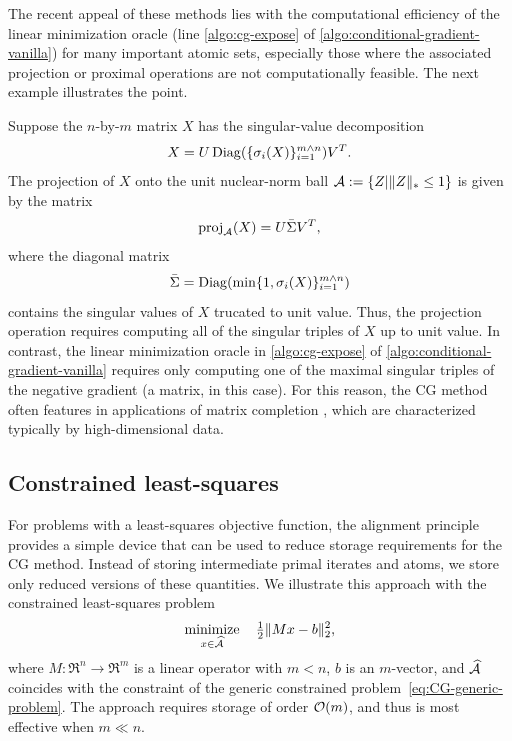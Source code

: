 The recent appeal of these methods lies with the computational efficiency of the
linear minimization oracle (line \ref{algo:cg-expose} of
\autoref{algo:conditional-gradient-vanilla}) for many important atomic sets,
especially those where the associated projection or proximal operations are not
computationally feasible. The next example illustrates the point.

\begin{example}
  Suppose the $n$-by-$m$ matrix $X$ has the singular-value decomposition
  \[
     X=U\operatorname{Diag}(\{\sigma_i(X)\}_{i=1}^{m\wedge n})V^T.
  \]
  The  projection of $X$ onto the unit nuclear-norm ball
  $\mathcal{A}:=\{Z|\|Z\|_*\le1\}$ is given by the matrix
\begin{equation*}
  \operatorname{proj}_{\mathcal{A}}(X) = U\bar\Sigma V^T,
\end{equation*}
where the diagonal matrix 
\begin{equation*}
  \bar\Sigma = \operatorname{Diag}(\min\{1,\sigma_i(X)\}^{m\wedge n}_{i=1})
\end{equation*}
contains the singular values of $X$ trucated to unit value. Thus, the projection
operation requires computing all of the singular triples of $X$ up to unit
value. In contrast, the linear minimization oracle in \autoref{algo:cg-expose} of
\autoref{algo:conditional-gradient-vanilla} requires only computing one of the
maximal singular triples of the negative gradient (a matrix, in this case). For
this reason, the CG method often features in applications of matrix completion
\cite{jaggi2010simple,shalev2011large,lee2009efficient}, which are characterized
typically by high-dimensional data.
\end{example}


\subsection{Constrained least-squares}

For problems with a least-squares objective function, the alignment principle
provides a simple device that can be used to reduce storage requirements for the
CG method. Instead of storing intermediate primal iterates and atoms, we store
only reduced versions of these quantities. We illustrate this approach with the
constrained least-squares problem
\begin{equation} \label{eq:CG-least-square}
   \displaystyle\mathop{\hbox{\rm minimize}}_{x\in\widehat{\mathcal{A}}}\enspace\enspace {\textstyle{\frac{1}{2}}}\|Mx - b\|_2^2,
\end{equation}
where $M:\Re^n\to\Re^m$ is a linear operator with $m < n$, $b$ is an $m$-vector,
and $\widehat{\mathcal{A}}$ coincides with the constraint of the generic constrained
problem~\eqref{eq:CG-generic-problem}. The approach requires storage of order
$\mathcal{O}(m)$, and thus is most effective when $m\ll n$.


